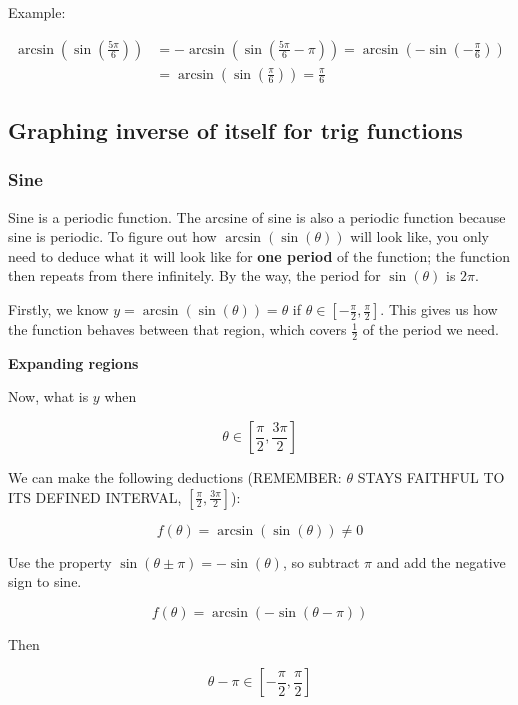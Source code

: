 \documentclass[
]{article}
\begin{document}
Example:

\begin{align*}
\arcsin\left( \sin\left( \frac{5\pi}{6} \right) \right) &= - \arcsin\left( \sin\left( \frac{5\pi}{6} - \pi \right) \right) = \arcsin\left( - \sin\left( - \frac{\pi}{6} \right) \right)
 \\
&= \arcsin\left( \sin\left( \frac{\pi}{6} \right) \right) = \frac{\pi}{6}
\end{align*}



\subsection{Graphing inverse of itself for trig
functions}


\subsubsection{\texorpdfstring{ Sine}{ Sine}}

Sine is a periodic function. The arcsine of sine is also a periodic
function because sine is periodic. To figure out how
$\arcsin\left( \sin(\theta) \right)$ will look like, you only need to
deduce what it will look like for \textbf{one period} of the function;
the function then repeats from there infinitely. By the way, the period
for $\sin(\theta)$ is $2\pi$.

Firstly, we know $y = \arcsin\left( \sin(\theta) \right) = \theta$ if
$\theta \in \left\lbrack - \frac{\pi}{2},\frac{\pi}{2} \right\rbrack$.
This gives us how the function behaves between that region, which covers
$\frac{1}{2}$ of the period we need.

\textbf{Expanding regions}

Now, what is $y$ when

$$\theta \in \left\lbrack \frac{\pi}{2},\frac{3\pi}{2} \right\rbrack$$

We can make the following deductions (REMEMBER: $\theta$ STAYS
FAITHFUL TO ITS DEFINED INTERVAL,
$\left\lbrack \frac{\pi}{2},\frac{3\pi}{2} \right\rbrack$):

$$f(\theta) = \arcsin\left( \sin(\theta) \right) \neq 0$$

Use the property $\sin(\theta \pm \pi) = - \sin(\theta)$, so subtract
$\pi$ and add the negative sign to sine.

$$f(\theta) = \arcsin\left( - \sin(\theta - \pi) \right)$$

Then

$$\theta - \pi \in \left\lbrack - \frac{\pi}{2},\frac{\pi}{2} \right\rbrack$$
\end{document}
